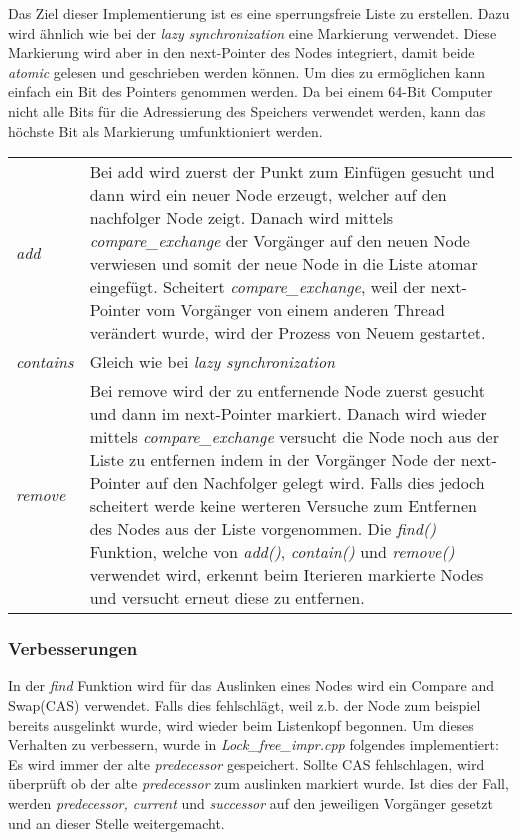 Das Ziel dieser Implementierung ist es eine sperrungsfreie Liste zu erstellen. Dazu wird ähnlich wie bei der \textit{lazy synchronization} eine Markierung verwendet. 
Diese Markierung wird aber in den next-Pointer des Nodes integriert, damit beide \textit{atomic} gelesen und geschrieben werden können. 
Um dies zu ermöglichen kann einfach ein Bit des Pointers genommen werden. Da bei einem 64-Bit Computer nicht alle Bits für die Adressierung 
des Speichers verwendet werden, kann das höchste Bit als Markierung umfunktioniert werden.

\begin{table}[H]
    \begin{tabularx}{\textwidth}{lX}
		\textit{add} & Bei add wird zuerst der Punkt zum Einfügen gesucht und dann wird ein neuer Node erzeugt, welcher auf den nachfolger Node zeigt. 
		Danach wird mittels \textit{compare\_exchange} der Vorgänger auf den neuen Node verwiesen und somit der neue Node in die Liste atomar eingefügt. 
		Scheitert \textit{compare\_exchange}, weil der next-Pointer vom Vorgänger von einem anderen Thread verändert wurde, wird der Prozess von Neuem gestartet. \\
        \textit{contains} & Gleich wie bei \textit{lazy synchronization} \\
		\textit{remove} & Bei remove wird der zu entfernende Node zuerst gesucht und dann im next-Pointer markiert. 
		Danach wird wieder mittels \textit{compare\_exchange} versucht 
		die Node noch aus der Liste zu entfernen indem in der Vorgänger Node der next-Pointer auf den Nachfolger gelegt wird. Falls dies jedoch scheitert werde 
		keine werteren Versuche zum Entfernen des Nodes aus der Liste vorgenommen. Die \textit{find()} Funktion, welche von \textit{add()}, \textit{contain()} und 
		\textit{remove()} verwendet wird, erkennt beim Iterieren markierte Nodes und versucht erneut diese zu entfernen. \\
    \end{tabularx}
\end{table}

\subsubsection{Verbesserungen}
\label{subsec:impr}
In der \textit{find} Funktion wird für das Auslinken eines Nodes wird ein Compare and Swap(CAS) verwendet. Falls dies fehlschlägt, 
weil z.b. der Node zum beispiel bereits ausgelinkt wurde,
wird wieder beim Listenkopf begonnen. Um dieses Verhalten zu verbessern, wurde in \textit{Lock\_free\_impr.cpp} folgendes implementiert:\\
Es wird immer der alte \textit{predecessor} gespeichert. Sollte CAS fehlschlagen, wird überprüft ob der alte \textit{predecessor}
zum auslinken markiert wurde. Ist dies der Fall, werden \textit{predecessor, current} und \textit{successor} auf den jeweiligen Vorgänger
gesetzt und an dieser Stelle weitergemacht. 